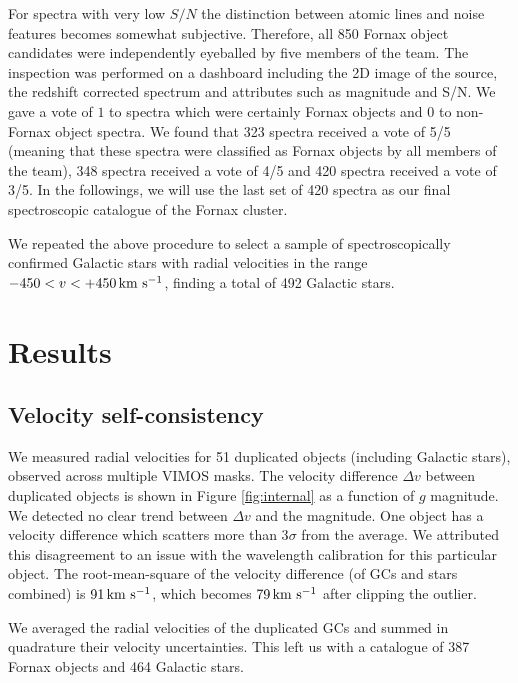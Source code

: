 \documentclass[useAMS,usenatbib]{mn2e}
\newcommand{\kms}{\mbox{\,km~s$^{-1}$}}
\begin{document}
For spectra with very low $S/N$ the distinction between atomic lines and noise 
features becomes somewhat subjective. Therefore, all 850 Fornax object 
candidates were independently eyeballed by five members of the team. The 
inspection was performed on a dashboard including the 2D image of the source, 
the redshift corrected spectrum and attributes such as magnitude and S/N. We 
gave a vote of $1$ to spectra which were certainly Fornax objects and $0$ to 
non-Fornax object spectra. We found that 323 spectra received a vote of 5/5 
(meaning that these spectra were classified as Fornax objects by all members of 
the team), 348 spectra received a vote of 4/5 and 420 spectra received a vote 
of 3/5. In the followings, we will use the last set of 420 spectra as our final 
spectroscopic catalogue of the Fornax cluster. 

We repeated the above procedure to select a sample of spectroscopically 
confirmed Galactic stars with radial velocities in the range $-450<v<+450 
\kms$, finding a total of 492 Galactic stars.

\section{Results}
\label{sec:analysis}
\subsection{Velocity self-consistency}

We measured radial velocities for 51 duplicated objects (including Galactic 
stars), observed across multiple VIMOS masks. The velocity difference $\Delta 
v$ between duplicated objects is shown in Figure \ref{fig:internal} as a 
function of $g$ magnitude. We detected no clear trend between $\Delta v$ and 
the magnitude. One object has a velocity difference which scatters more than 
3$\sigma$ from the average. We attributed this disagreement to an issue with 
the wavelength calibration for this particular object. The root-mean-square of 
the velocity difference (of GCs and stars combined) is $91 \kms$, which becomes 
$79\kms$ after clipping the outlier. 

We averaged the radial velocities of the duplicated GCs and summed in 
quadrature their velocity uncertainties. This left us with a catalogue of 387 
Fornax objects and 464 Galactic stars.
\end{document}
